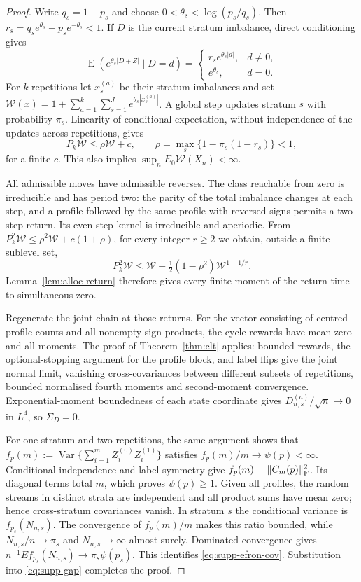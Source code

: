 \documentclass[12pt,a4paper]{article}
\theoremstyle{definition}
\theoremstyle{remark}\newtheorem{remark}{Remark}
\numberwithin{equation}{section}
\newcommand{\E}{\operatorname{E}}
\newcommand{\Var}{\operatorname{Var}}
\begin{document}
\begin{proof}
Write $q_s=1-p_s$ and choose $0<\theta_s<\log(p_s/q_s)$. Then
$r_s=q_s e^{\theta_s}+p_s e^{-\theta_s}<1$. If $D$ is the current stratum imbalance, direct conditioning gives
\[
 \E(e^{\theta_s|D+Z|}\mid D=d)=
 \begin{cases}r_s e^{\theta_s|d|},&d\ne0,\\ e^{\theta_s},&d=0.\end{cases}
\]
For $k$ repetitions let $x_s^{(a)}$ be their stratum imbalances and set
$\mathcal W(x)=1+\sum_{a=1}^k\sum_{s=1}^J e^{\theta_s|x_s^{(a)}|}$.
A global step updates stratum $s$ with probability $\pi_s$. Linearity of conditional expectation, without independence of the updates across repetitions, gives
\[
 P_k\mathcal W\le\rho \mathcal W+c,\qquad
 \rho=\max_s\{1-\pi_s(1-r_s)\}<1,
\]
for a finite $c$. This also implies $\sup_n E_0 \mathcal W(X_n)<\infty$.

All admissible moves have admissible reverses. The class reachable from zero is irreducible and has period two: the parity of the total imbalance changes at each step, and a profile followed by the same profile with reversed signs permits a two-step return. Its even-step kernel is irreducible and aperiodic. From $P_k^2\mathcal W\le\rho^2 \mathcal W+c(1+\rho)$, for every integer $r\ge2$ we obtain, outside a finite sublevel set,
\[
 P_k^2\mathcal W\le \mathcal W-\tfrac12(1-\rho^2)\mathcal W^{1-1/r}.
\]
Lemma~\ref{lem:alloc-return} therefore gives every finite moment of the return time to simultaneous zero.

Regenerate the joint chain at those returns. For the vector consisting of centred profile counts and all nonempty sign products, the cycle rewards have mean zero and all moments. The proof of Theorem~\ref{thm:clt} applies: bounded rewards, the optional-stopping argument for the profile block, and label flips give the joint normal limit, vanishing cross-covariances between different subsets of repetitions, bounded normalised fourth moments and second-moment convergence. Exponential-moment boundedness of each state coordinate gives $D_{n,s}^{(a)}/\sqrt n\to0$ in $L^4$, so $\Sigma_D=0$.

For one stratum and two repetitions, the same argument shows that
$f_p(m):=\Var\{\sum_{i=1}^m Z_i^{(0)}Z_i^{(1)}\}$ satisfies $f_p(m)/m\to\psi(p)<\infty$. Conditional independence and label symmetry give $f_p(m)=\|C_m(p)\|_{\rm F}^2$. Its diagonal terms total $m$, which proves $\psi(p)\ge1$. Given all profiles, the random streams in distinct strata are independent and all product sums have mean zero; hence cross-stratum covariances vanish. In stratum $s$ the conditional variance is $f_{p_s}(N_{n,s})$. The convergence of $f_p(m)/m$ makes this ratio bounded, while $N_{n,s}/n\to\pi_s$ and $N_{n,s}\to\infty$ almost surely. Dominated convergence gives $n^{-1}E f_{p_s}(N_{n,s})\to\pi_s\psi(p_s)$. This identifies \eqref{eq:supp-efron-cov}. Substitution into \eqref{eq:supp-gap} completes the proof.
\end{proof}
\end{document}
